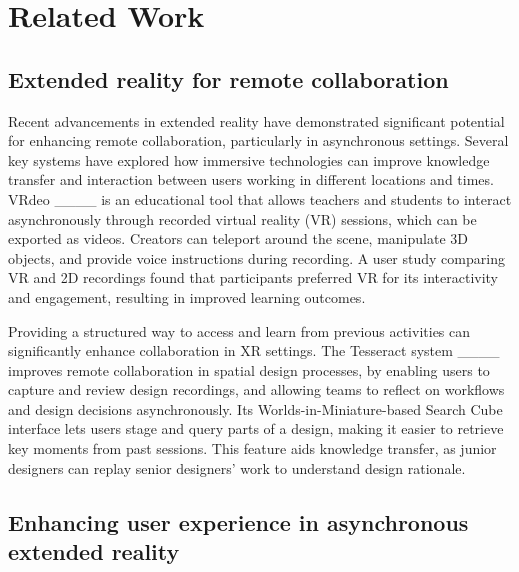 \section{Related Work}
\subsection{Extended reality for remote collaboration}

Recent advancements in extended reality have demonstrated significant potential for enhancing remote collaboration, particularly in asynchronous settings. Several key systems have explored how immersive technologies can improve knowledge transfer and interaction between users working in different locations and times. VRdeo ____ is an educational tool that allows teachers and students to interact asynchronously through recorded virtual reality (VR) sessions, which can be exported as videos. Creators can teleport around the scene, manipulate 3D objects, and provide voice instructions during recording. A user study comparing VR and 2D recordings found that participants preferred VR for its interactivity and engagement, resulting in improved learning outcomes.

Providing a structured way to access and learn from previous activities can significantly enhance collaboration in XR settings. The Tesseract system ____ improves remote collaboration in spatial design processes, by enabling users to capture and review design recordings, and allowing teams to reflect on workflows and design decisions asynchronously. Its Worlds-in-Miniature-based Search Cube interface lets users stage and query parts of a design, making it easier to retrieve key moments from past sessions. This feature aids knowledge transfer, as junior designers can replay senior designers' work to understand design rationale. 

\subsection{Enhancing user experience in asynchronous extended reality}

